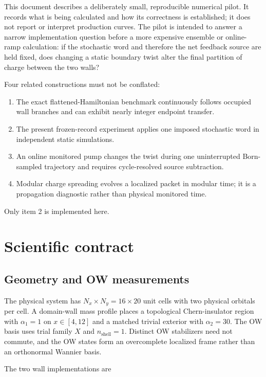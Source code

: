 \documentclass[aps,prb,twocolumn,floatfix,nofootinbib,superscriptaddress]{revtex4-2}
\begin{document}
This document describes a deliberately small, reproducible numerical pilot.
It records what is being calculated and how its correctness is established;
it does not report or interpret production curves.  The pilot is intended to
answer a narrow implementation question before a more expensive ensemble or
online-ramp calculation: if the stochastic word and therefore the net
feedback source are held fixed, does changing a static boundary twist alter
the final partition of charge between the two walls?

Four related constructions must not be conflated:

\begin{enumerate}
  \item The exact flattened-Hamiltonian benchmark continuously follows
  occupied wall branches and can exhibit nearly integer endpoint transfer.
  \item The present frozen-record experiment applies one imposed stochastic
  word in independent static simulations.
  \item An online monitored pump changes the twist during one uninterrupted
  Born-sampled trajectory and requires cycle-resolved source subtraction.
  \item Modular charge spreading evolves a localized packet in modular time;
  it is a propagation diagnostic rather than physical monitored time.
\end{enumerate}

Only item 2 is implemented here.

\section{Scientific contract}

\subsection{Geometry and OW measurements}

The physical system has $N_x\times N_y=16\times20$ unit cells with two
physical orbitals per cell.  A domain-wall mass profile places a topological
Chern-insulator region with $\alpha_1=1$ on $x\in[4,12]$ and a matched
trivial exterior with $\alpha_2=30$.  The OW basis uses trial family $X$ and
$n_{\mathrm{shell}}=1$.  Distinct OW stabilizers need not commute, and the OW
states form an overcomplete localized frame rather than an orthonormal Wannier
basis.

The two wall implementations are
\end{document}
